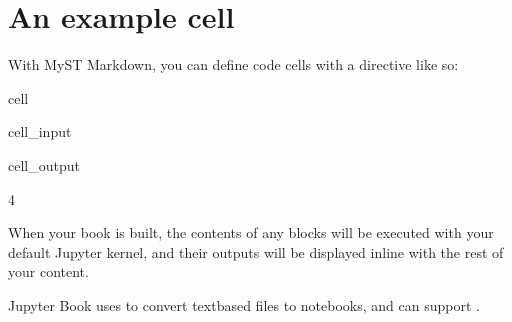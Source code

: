 \documentclass[letterpaper,10pt,english]{jupyterBook}
\begin{document}
\section{An example cell}
\label{\detokenize{src/test/markdown-notebooks:an-example-cell}}
\sphinxAtStartPar
With MyST Markdown, you can define code cells with a directive like so:

\begin{sphinxuseclass}{cell}\begin{sphinxVerbatimInput}

\begin{sphinxuseclass}{cell_input}
\begin{sphinxVerbatim}[commandchars=\\\{\}]
  
\end{sphinxVerbatim}

\end{sphinxuseclass}\end{sphinxVerbatimInput}
\begin{sphinxVerbatimOutput}

\begin{sphinxuseclass}{cell_output}
\begin{sphinxVerbatim}[commandchars=\\\{\}]
4
\end{sphinxVerbatim}

\end{sphinxuseclass}\end{sphinxVerbatimOutput}

\end{sphinxuseclass}
\sphinxAtStartPar
When your book is built, the contents of any  blocks will be
executed with your default Jupyter kernel, and their outputs will be displayed
in\sphinxhyphen{}line with the rest of your content.


\nopagebreak


\sphinxAtStartPar
Jupyter Book uses  to convert text\sphinxhyphen{}based files to notebooks, and can support .
\end{document}
